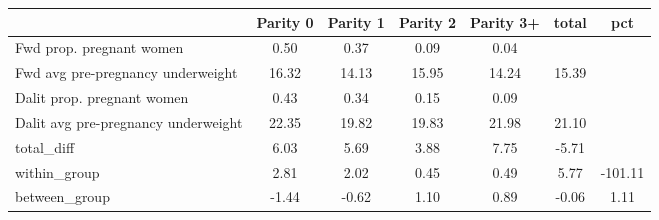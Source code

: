 \begin{tabular}{l*{6}{c}}
\toprule
            &\multicolumn{1}{c}{Parity 0}&\multicolumn{1}{c}{Parity 1}&\multicolumn{1}{c}{Parity 2}&\multicolumn{1}{c}{Parity 3+}&\multicolumn{1}{c}{total}&\multicolumn{1}{c}{pct}\\
\midrule
\midrule
Fwd prop. pregnant women&        0.50&        0.37&        0.09&        0.04&            &            \\
Fwd avg pre-pregnancy underweight&       16.32&       14.13&       15.95&       14.24&       15.39&            \\
Dalit prop. pregnant women&        0.43&        0.34&        0.15&        0.09&            &            \\
Dalit avg pre-pregnancy underweight&       22.35&       19.82&       19.83&       21.98&       21.10&            \\
total\_diff  &        6.03&        5.69&        3.88&        7.75&       -5.71&            \\
within\_group&        2.81&        2.02&        0.45&        0.49&        5.77&     -101.11\\
between\_group&       -1.44&       -0.62&        1.10&        0.89&       -0.06&        1.11\\
\bottomrule
\end{tabular}
